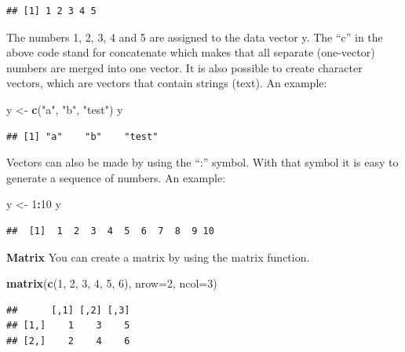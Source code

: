 \documentclass[]{book}
\newenvironment{Shaded}{\begin{snugshade}}{\end{snugshade}}
\newcommand{\KeywordTok}[1]{\textcolor[rgb]{0.13,0.29,0.53}{\textbf{#1}}}
\newcommand{\DataTypeTok}[1]{\textcolor[rgb]{0.13,0.29,0.53}{#1}}
\newcommand{\DecValTok}[1]{\textcolor[rgb]{0.00,0.00,0.81}{#1}}
\newcommand{\StringTok}[1]{\textcolor[rgb]{0.31,0.60,0.02}{#1}}
\newcommand{\OperatorTok}[1]{\textcolor[rgb]{0.81,0.36,0.00}{\textbf{#1}}}
\newcommand{\NormalTok}[1]{#1}
\theoremstyle{definition}
\theoremstyle{definition}
\theoremstyle{definition}
\theoremstyle{remark}
\begin{document}
\begin{verbatim}
## [1] 1 2 3 4 5
\end{verbatim}

The numbers 1, 2, 3, 4 and 5 are assigned to the data vector y. The
``c'' in the above code stand for concatenate which makes that all
separate (one-vector) numbers are merged into one vector. It is also
possible to create character vectors, which are vectors that contain
strings (text). An example:

\begin{Shaded}
\begin{Highlighting}[]
\NormalTok{y <-}\StringTok{ }\KeywordTok{c}\NormalTok{(}\StringTok{"a"}\NormalTok{, }\StringTok{"b"}\NormalTok{, }\StringTok{"test"}\NormalTok{)}
\NormalTok{y}
\end{Highlighting}
\end{Shaded}

\begin{verbatim}
## [1] "a"    "b"    "test"
\end{verbatim}

Vectors can also be made by using the ``:'' symbol. With that symbol it
is easy to generate a sequence of numbers. An example:

\begin{Shaded}
\begin{Highlighting}[]
\NormalTok{y <-}\StringTok{ }\DecValTok{1}\OperatorTok{:}\DecValTok{10}
\NormalTok{y}
\end{Highlighting}
\end{Shaded}

\begin{verbatim}
##  [1]  1  2  3  4  5  6  7  8  9 10
\end{verbatim}

\textbf{Matrix} You can create a matrix by using the matrix function.

\begin{Shaded}
\begin{Highlighting}[]
\KeywordTok{matrix}\NormalTok{(}\KeywordTok{c}\NormalTok{(}\DecValTok{1}\NormalTok{, }\DecValTok{2}\NormalTok{, }\DecValTok{3}\NormalTok{, }\DecValTok{4}\NormalTok{, }\DecValTok{5}\NormalTok{, }\DecValTok{6}\NormalTok{), }\DataTypeTok{nrow=}\DecValTok{2}\NormalTok{, }\DataTypeTok{ncol=}\DecValTok{3}\NormalTok{)}
\end{Highlighting}
\end{Shaded}

\begin{verbatim}
##      [,1] [,2] [,3]
## [1,]    1    3    5
## [2,]    2    4    6
\end{verbatim}
\end{document}
